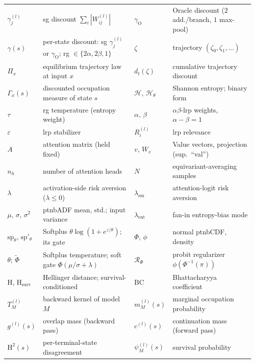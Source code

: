 \begin{table}[H]
\begin{tabularx}{\textwidth}{@{}l X l X@{}}
        $\gamma^{(l)}_j$ & \ac{sg} discount $\sum_i |W^{(l)}_{ij}|$ & $\gamma_{\mathrm{O}}$ & Oracle
        discount ($2$ add./branch, $1$ max-pool) \\
        $\gamma(s)$ & per-state discount: \ac{sg} $\gamma^{(l)}_j$ or $\gamma_{\mathrm{O}}$; \ac{rg} $\in
            \{2\alpha, 2\beta, 1\}$ & $\zeta$ & trajectory $(\zeta_0, \zeta_1, \dots)$ \\
        $\Pi_x$ & equilibrium trajectory law at input $x$ & $d_t(\zeta)$ & cumulative trajectory discount
        \\
        $\Gamma_x(s)$ & discounted occupation measure of state $s$ & $\mathcal{H}$, $\mathcal{H}_\theta$ &
        Shannon entropy; binary form \\
        \midrule
        $\tau$ & \ac{rg} temperature (entropy weight) & $\alpha$, $\beta$ & $\alpha\beta$-\ac{lrp} weights,
        $\alpha - \beta = 1$ \\
        $\varepsilon$ & \ac{lrp} stabilizer & $R^{(l)}_i$ & \ac{lrp} relevance \\
        $A$ & attention matrix (held fixed) & $v$, $W_v$ & Value vectors, projection (sup.\ ``val'') \\
        $n_h$ & number of attention heads & $N$ & equivariant-averaging samples \\
        \midrule
        $\lambda$ & activation-side risk aversion ($\lambda \le 0$) & $\lambda_{\mathrm{sm}}$ &
        attention-logit risk aversion \\
        $\mu$, $\sigma$, $\sigma^2$ & \ac{ptnbADF} mean, std.; input variance & $\lambda_{\mathrm{ent}}$ &
        fan-in entropy-bias mode \\
        $\mathrm{sp}_\theta$, $\mathrm{sp}'_\theta$ & Softplus $\theta\log(1 {+} e^{z/\theta})$; its gate &
        $\Phi$, $\phi$ & normal \ac{ptnbCDF}, density \\
        $\theta$; $\tilde\Phi$ & Softplus temperature; soft gate $\Phi(\mu/\sigma+\lambda)$ &
        $\mathcal{R}_\Phi$ & probit regularizer $\phi(\Phi^{-1}(\pi))$ \\
        \midrule
        $\mathrm{H}$, $\mathrm{H}_{\mathrm{surv}}$ & Hellinger distance; survival-conditioned & BC &
        Bhattacharyya coefficient \\
        $T^{(l)}_M$ & backward kernel of model $M$ & $m^{(l)}_M(s)$ & marginal occupation probability \\
        $g^{(l)}(s)$ & overlap mass (backward pass) & $c^{(l)}(s)$ & continuation mass (forward pass) \\
        $\mathrm{H}^2(s)$ & per-terminal-state disagreement & $\psi^{(l)}_M(s)$ & survival probability \\
        \bottomrule
    \end{tabularx}
\end{table}
\par\medskip
